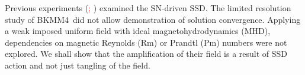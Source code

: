 \documentclass[preprint2]{aastex63}
\newcommand\BKM{{\sf BKMM4}}
\newcommand{\fg}[1]{\textcolor{midgreen}{#1}}
\newcommand{\mjk}[1]{\textcolor{red}{#1}}
\begin{document}
 Previous experiments (\mjk{\citealp[e.g.,][(\BKM)]{BKMM04};
 \citealp{BalKim05,MacLow:2005}})
 examined the SN-driven SSD.
 \fg{The limited  resolution} \fg{study} \fg{of \BKM\ did not allow
 demonstration of \fg{solution} convergence.
 Applying a weak imposed uniform field with ideal magnetohydrodynamics (MHD),
 dependencies on magnetic Reynolds (Rm) or Prandtl (Pm) numbers were not
 explored.}
 We shall show that the amplification of their field is a result
 of SSD action and not just tangling of the field.
\end{document}
